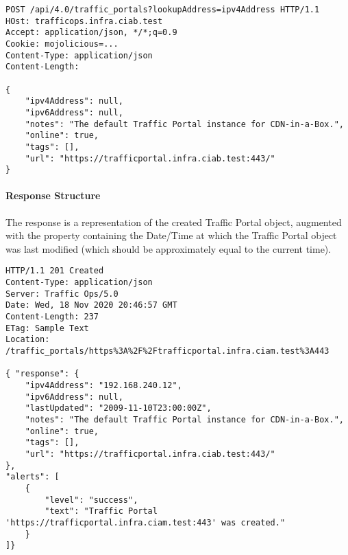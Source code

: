 \begin{codelisting}
\begin{verbatim}
POST /api/4.0/traffic_portals?lookupAddress=ipv4Address HTTP/1.1
HOst: trafficops.infra.ciab.test
Accept: application/json, */*;q=0.9
Cookie: mojolicious=...
Content-Type: application/json
Content-Length:

{
	"ipv4Address": null,
	"ipv6Address": null,
	"notes": "The default Traffic Portal instance for CDN-in-a-Box.",
	"online": true,
	"tags": [],
	"url": "https://trafficportal.infra.ciab.test:443/"
}

\end{verbatim}
\end{codelisting}

\paragraph{Response Structure}
The response is a representation of the created Traffic Portal object, augmented
with the  property containing the Date/Time at which the
Traffic Portal object was last modified (which should be approximately equal to
the current time).

\begin{codelisting}
\begin{verbatim}
HTTP/1.1 201 Created
Content-Type: application/json
Server: Traffic Ops/5.0
Date: Wed, 18 Nov 2020 20:46:57 GMT
Content-Length: 237
ETag: Sample Text
Location: /traffic_portals/https%3A%2F%2Ftrafficportal.infra.ciam.test%3A443

{ "response": {
	"ipv4Address": "192.168.240.12",
	"ipv6Address": null,
	"lastUpdated": "2009-11-10T23:00:00Z",
	"notes": "The default Traffic Portal instance for CDN-in-a-Box.",
	"online": true,
	"tags": [],
	"url": "https://trafficportal.infra.ciab.test:443/"
},
"alerts": [
	{
		"level": "success",
		"text": "Traffic Portal 'https://trafficportal.infra.ciam.test:443' was created."
	}
]}
\end{verbatim}
\end{codelisting}

